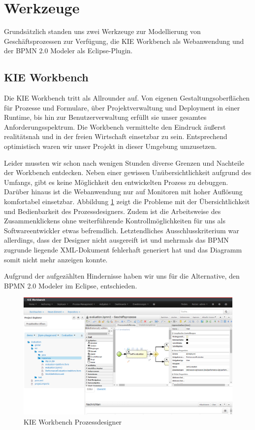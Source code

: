 \section{Werkzeuge}
Grundsätzlich standen uns zwei Werkzeuge zur Modellierung von Geschäftsprozessen zur Verfügung, die KIE Workbench als Webanwendung und der BPMN 2.0 Modeler als Eclipse-Plugin.
\subsection{KIE Workbench}
Die KIE Workbench tritt als Allrounder auf. Von eigenen Gestaltungsoberflächen für Prozesse und Formulare, über Projektverwaltung und Deployment in einer Runtime, bis hin zur Benutzerverwaltung erfüllt sie unser gesamtes Anforderungsspektrum. Die Workbench vermittelte den Eindruck äußerst realitätsnah und in der freien Wirtschaft einsetzbar zu sein. Entsprechend optimistisch waren wir unser Projekt in dieser Umgebung umzusetzen.

Leider mussten wir schon nach wenigen Stunden diverse Grenzen und Nachteile der Workbench entdecken. Neben einer gewissen Unübersichtlichkeit aufgrund des Umfangs, gibt es keine Möglichkeit den entwickelten Prozess zu debuggen. Darüber hinaus ist die Webanwendung nur auf Monitoren mit hoher Auflösung komfortabel einsetzbar. Abbildung \ref{fig:KieWorkbench} zeigt die Probleme mit der Übersichtlichkeit und Bedienbarkeit des Prozessdesigners. Zudem ist die Arbeitsweise des Zusammenklickens ohne weiterführende Kontrollmöglichkeiten für uns als Softwareentwickler etwas befremdlich. Letztendliches Ausschlusskriterium war allerdings, dass der Designer nicht ausgereift ist und mehrmals das BPMN zugrunde liegende XML-Dokument fehlerhaft generiert hat und das Diagramm somit nicht mehr anzeigen konnte.

Aufgrund der aufgezählten Hindernisse haben wir uns für die Alternative, den BPMN 2.0 Modeler im Eclipse, entschieden.

\begin{figure}[H]
\centering
\includegraphics[width=0.95\linewidth]{../Bilder/KieWorkbench}
\caption{KIE Workbench Prozessdesigner}
\label{fig:KieWorkbench}
\end{figure}


